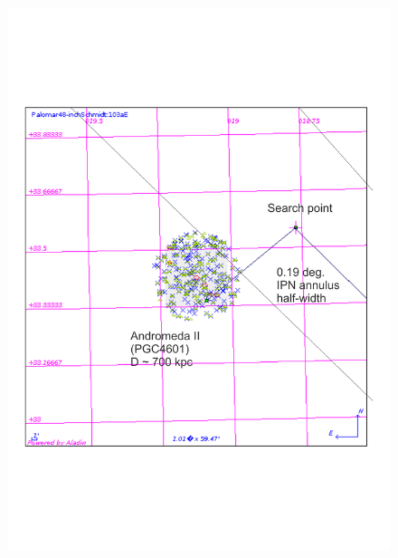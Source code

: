\begin{figure}[ht!]
\begin{minipage}{0.4\linewidth}
\centering
\includegraphics[scale=0.415]{Images/andromeda2.pdf}
\end{minipage}
\hspace{0.5cm}
\begin{minipage}{0.5\linewidth}
\centering

\end{minipage}
\end{figure}
